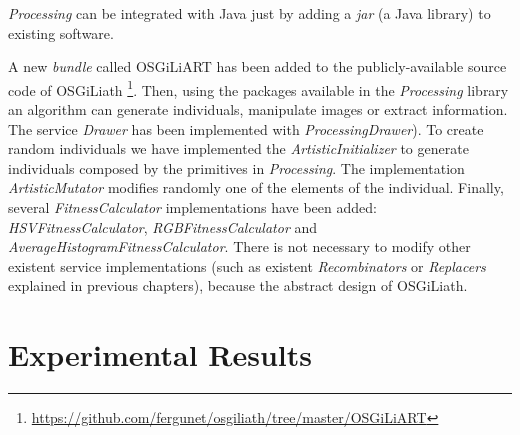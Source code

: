 {\em Processing} %
can be integrated with Java just by adding a {\em jar} (a
Java library) to existing software.

A new {\em bundle} called OSGiLiART has been
added to the publicly-available source code of OSGiLiath \footnote{\url{https://github.com/fergunet/osgiliath/tree/master/OSGiLiART}}.  %
Then, using the packages available in the {\em Processing} library an algorithm can generate individuals, manipulate images or extract information. The service {\em Drawer} has been implemented with  {\em ProcessingDrawer}). To create random individuals we have implemented the {\em ArtisticInitializer} to generate individuals composed by the primitives in {\em Processing}. The implementation {\em ArtisticMutator} modifies randomly one of the elements of the individual. Finally, several {\em FitnessCalculator} implementations have been added: {\em HSVFitnessCalculator}, {\em RGBFitnessCalculator} and {\em AverageHistogramFitnessCalculator}. There is not necessary to modify other existent service implementations (such as existent {\em Recombinators} or {\em Replacers} explained in previous chapters), because the abstract design of OSGiLiath.















\section{Experimental Results}
\label{sec:results}

